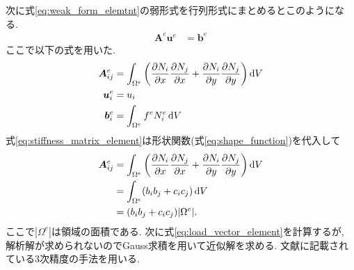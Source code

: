 \documentclass[paper=a4]{jlreq}
\begin{document}
次に式\eqref{eq:weak_form_elemtnt}の弱形式を行列形式にまとめるとこのようになる.
\begin{align}
    \bm{A}^e\bm{u}^e &= \bm{b}^e
\end{align}
ここで以下の式を用いた.
\begin{align}
    \bm{A}^e_{ij}
    &= \int_{\Omega^e} \qty(\pdv{N_i}{x}\pdv{N_j}{x} + \pdv{N_i}{y}\pdv{N_j}{y}) \dd{V}
    \label{eq:stiffness_matrix_element}\\
    \bm{u}^e_i &= u_i \\
    \bm{b}^e_i
    &= \int_{\Omega^e} f^eN_i^e\dd{V}
    \label{eq:load_vector_element}
\end{align}
式\eqref{eq:stiffness_matrix_element}は形状関数(式\eqref{eq:shape_function})を代入して
\begin{align}
    \begin{split}
        \bm{A}^e_{ij}
        &= \int_{\Omega^e} \qty(\pdv{N_i}{x}\pdv{N_j}{x} + \pdv{N_i}{y}\pdv{N_j}{y}) \dd{V}  \\
        &= \int_{\Omega^e} (b_ib_j+c_ic_j)\dd{V} \\
        &= (b_ib_j+c_ic_j)|\Omega^e|.
    \end{split}
\end{align}
ここで$|\Omega^e|$は領域の面積である.
次に式\eqref{eq:load_vector_element}を計算するが, 
解析解が求められないのでGauss求積を用いて近似解を求める.
文献\cite{Wriggers2006}に記載されている3次精度の手法を用いる.
\end{document}
